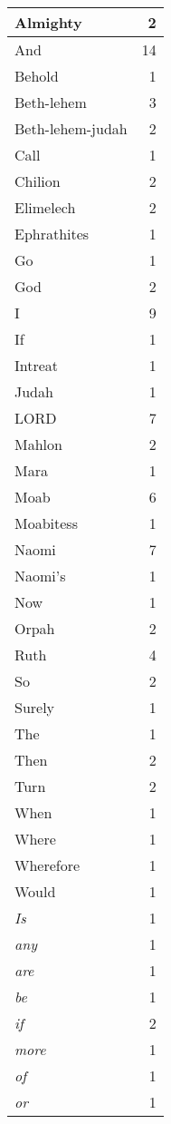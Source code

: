 \begin{center}
\begin{longtable}{l|r}
\hline \hline
\endlastfoot
Almighty & 2 \\ \hline
And & 14 \\ \hline
Behold & 1 \\ \hline
Beth-lehem & 3 \\ \hline
Beth-lehem-judah & 2 \\ \hline
Call & 1 \\ \hline
Chilion & 2 \\ \hline
Elimelech & 2 \\ \hline
Ephrathites & 1 \\ \hline
Go & 1 \\ \hline
God & 2 \\ \hline
I & 9 \\ \hline
If & 1 \\ \hline
Intreat & 1 \\ \hline
Judah & 1 \\ \hline
LORD & 7 \\ \hline
Mahlon & 2 \\ \hline
Mara & 1 \\ \hline
Moab & 6 \\ \hline
Moabitess & 1 \\ \hline
Naomi & 7 \\ \hline
Naomi's & 1 \\ \hline
Now & 1 \\ \hline
Orpah & 2 \\ \hline
Ruth & 4 \\ \hline
So & 2 \\ \hline
Surely & 1 \\ \hline
The & 1 \\ \hline
Then & 2 \\ \hline
Turn & 2 \\ \hline
When & 1 \\ \hline
Where & 1 \\ \hline
Wherefore & 1 \\ \hline
Would & 1 \\ \hline
\emph{Is} & 1 \\ \hline
\emph{any} & 1 \\ \hline
\emph{are} & 1 \\ \hline
\emph{be} & 1 \\ \hline
\emph{if} & 2 \\ \hline
\emph{more} & 1 \\ \hline
\emph{of} & 1 \\ \hline
\emph{or} & 1 \\ \hline

\end{longtable}
\end{center}
